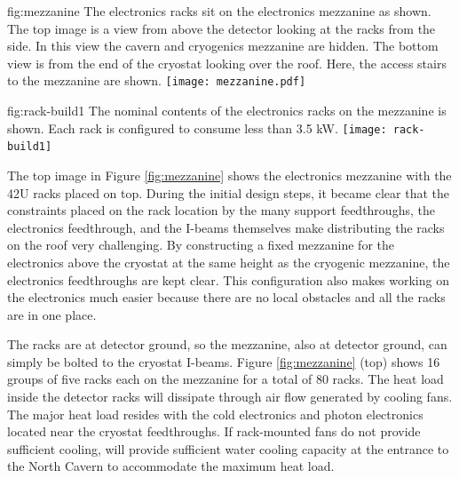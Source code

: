 \begin{dunefigure}{fig:mezzanine}
  {The electronics racks sit on the  electronics mezzanine as shown. The top image is a view from above the detector looking at the racks from the side. In this view the cavern and cryogenics mezzanine are hidden. The bottom view is from the end of the cryostat looking over the roof. Here, the access stairs to the mezzanine are shown.}
 \texttt{[image: mezzanine.pdf]}
\end{dunefigure}

\begin{dunefigure}{fig:rack-build1}
  {The nominal contents of the electronics racks on the mezzanine is shown. Each rack is configured to consume less than 3.5 \si{kW}. }
 \texttt{[image: rack-build1]} %
\end{dunefigure}

The top image in Figure \ref{fig:mezzanine} shows the  electronics mezzanine with the 42U racks placed on top. 
During the initial design steps, it became clear that the constraints placed on the rack location by the many  support feedthroughs, the electronics feedthrough, and the I-beams themselves make distributing the racks on the roof very challenging. 
By constructing a fixed mezzanine for the electronics 
above the cryostat at the same height as the cryogenic mezzanine, the electronics feedthroughs are kept clear. 
This configuration also makes working on the electronics much easier because there are no local obstacles and all the racks are in one place.

The racks are %
at detector ground, so the mezzanine, %
also at detector 
ground, %
can simply be bolted to the cryostat I-beams. 
Figure \ref{fig:mezzanine} (top) shows 16 groups of five racks each %
on the mezzanine for a total of 80 racks. 
The heat load inside the detector racks will %
dissipate through air flow generated by cooling fans.  The major heat load resides with the cold electronics and photon electronics located near the cryostat feedthroughs.  If rack-mounted fans do not provide sufficient cooling,   will provide sufficient water cooling capacity at the entrance to the North Cavern to accommodate the maximum heat load. 

